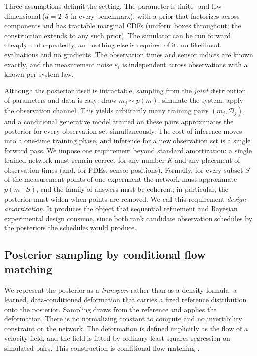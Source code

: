 \documentclass[10pt]{article}
\newcommand{\D}{\mathcal{D}}
\begin{document}
Three assumptions delimit the setting. The parameter is finite- and low-dimensional ($d = 2$--$5$ in
every benchmark), with a prior that factorizes across components and has tractable marginal CDFs
(uniform boxes throughout; the construction extends to any such prior). The simulator can be run
forward cheaply and repeatedly, and nothing else is required of it: no likelihood evaluations and no
gradients. The observation times and sensor indices are known exactly, and the measurement noise
$\varepsilon_i$ is independent across observations with a known per-system law.

Although the posterior itself is intractable, sampling from the \emph{joint} distribution of
parameters and data is easy: draw $m_j \sim p(m)$, simulate the system, apply the observation channel.
This yields arbitrarily many training pairs $(m_j, \D_j)$, and a conditional generative model trained
on these pairs approximates the posterior for every observation set simultaneously. The cost of
inference moves into a one-time training phase, and inference for a new observation set is a single
forward pass. We impose one requirement beyond standard amortization: a single trained network must
remain correct for any number $K$ and any placement of observation times (and, for PDEs, sensor
positions). Formally, for every subset $S$ of the measurement points of one experiment the network
must approximate $p(m \mid S)$, and the family of answers must be coherent; in particular, the
posterior must widen when points are removed. We call this requirement \emph{design amortization}. It
produces the object that sequential refinement and Bayesian experimental design consume, since both
rank candidate observation schedules by the posteriors the schedules would produce.

\subsection{Posterior sampling by conditional flow matching}
\label{sec:method}

We represent the posterior as a \emph{transport} rather than as a density formula: a learned,
data-conditioned deformation that carries a fixed reference distribution onto the posterior. Sampling
draws from the reference and applies the deformation. There is no normalizing constant to compute and
no invertibility constraint on the network. The deformation is defined implicitly as the flow of a
velocity field, and the field is fitted by ordinary least-squares regression on simulated pairs. This
construction is conditional flow matching \citep{lipman2023}.
\end{document}

